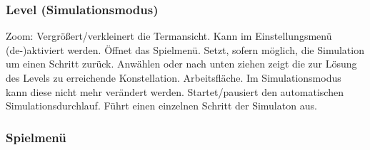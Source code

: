 \subsubsection{Level (Simulationsmodus)}

\begin{center}
\setlength\fboxsep{20pt}
\setlength\fboxrule{1pt}
\end{center}

\begin{requirements}
 Zoom: Vergrößert/verkleinert die Termansicht. Kann im Einstellungsmenü (de-)aktiviert werden.
 Öffnet das Spielmenü.
 Setzt, sofern möglich, die Simulation um einen Schritt zurück.
 Anwählen oder nach unten ziehen zeigt die zur Lösung des Levels zu erreichende Konstellation.
 Arbeitsfläche. Im Simulationsmodus kann diese nicht mehr verändert werden.
 Startet/pausiert den automatischen Simulationsdurchlauf.
 Führt einen einzelnen Schritt der Simulaton aus.
\end{requirements}

\subsubsection{Spielmenü}

\begin{center}
\setlength\fboxsep{20pt}
\setlength\fboxrule{1pt}
\end{center}

